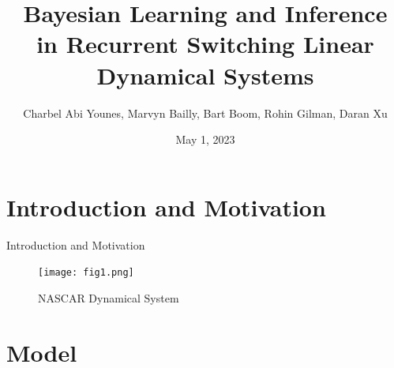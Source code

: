 \documentclass{beamer}
\title[RSLDS]{\small Bayesian Learning and Inference \\ in Recurrent Switching Linear Dynamical Systems}
\author{Charbel Abi Younes, Marvyn Bailly, Bart Boom, Rohin Gilman, Daran Xu}
\date{May 1, 2023}
\begin{document}
\begin{frame}
    \maketitle
\end{frame}

\section{Introduction and Motivation}

\begin{frame}{Introduction and Motivation}
        \begin{figure}[h!]
            \centering
            \texttt{[image: fig1.png]}
            \caption{NASCAR Dynamical System}
        \end{figure}

    \end{frame}

\section{Model}
\end{document}
